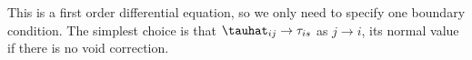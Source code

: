This is a first order differential equation, so we only need to specify one boundary condition. The simplest choice is that $\tauhat_{i j} \rightarrow \tau_{i s}$ as $j \rightarrow i$, its normal value if there is no void correction.
  